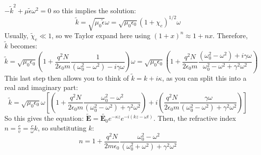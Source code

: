 \( -\tilde k^2 + \mu \tilde \epsilon \omega^2 = 0 \) so this implies the solution:
\[
	\tilde k = \sqrt{\mu_0 \tilde \epsilon} \omega = \sqrt{\mu_0 \epsilon_0} ( 1 + \chi_e)^{1 / 2} \omega
\]
Usually, \( \tilde \chi_e \ll 1  \), so we Taylor expand here using \( (1 + x)^{n} \approx 1 + nx \).
Therefore, \( \tilde k \) becomes:
\[
	\tilde k = \sqrt{\mu_0 \epsilon_0}\left( 1 + \frac{q^2 N}{2 \epsilon_0 m}\frac{1}{(\omega_0^2 - \omega^2)
	- i \gamma \omega} \right)\omega = \sqrt{\mu_0 \epsilon_0}\left( 1 + \frac{q^2N}{2 \epsilon_0
	m}\frac{(\omega_0^2 - \omega^2) + i \gamma \omega}{\omega_0^2 - \omega^2 + \gamma^2 \omega^2} \right)
\]
This last step then allows you to think of \( \tilde k = k + i \kappa \), as you can split this into a real
and imaginary part:
\[
	\tilde k = \sqrt{\mu_0 \epsilon_0}\omega \left[ \left( 1 + \frac{q^2 N}{2 \epsilon_0 m }\frac{\omega_0^2
	- \omega^2}{(\omega_0^2 - \omega^2) + \gamma^2 \omega^2} \right) + i \left(\frac{q^2N}{2 \epsilon_0
m}\frac{\gamma \omega}{(\omega_0^2 - \omega^2) + \gamma^2 \omega^2}\right) \right]
\]
So this gives the equation: \( \tilde{\mathbf{E}} = \tilde{\mathbf{E}_0} e^{-\kappa z} e^{-i(kz - \omega t)}
\). Then, the refractive index \( n = \frac{c}{v} = \frac{c}{\omega} k \), so substituting \( k \):
\[
	n = 1 + \frac{q^2N}{2 m \epsilon_0}\frac{\omega_0^2 - \omega^2}{(\omega_0^2 + \omega^2) + \gamma ^2
	\omega^2}
\]

